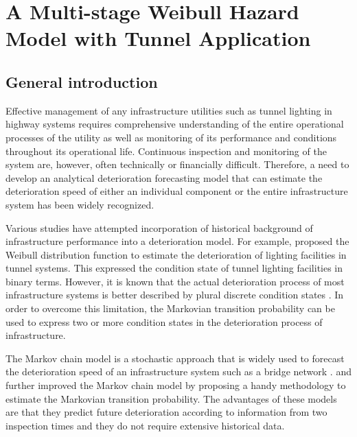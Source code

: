 
\chapter{A Multi-stage Weibull Hazard Model with Tunnel Application} %
\label{Chapter3}

\section{General introduction}
\label{31}
Effective management of any infrastructure utilities such as tunnel lighting in highway systems requires comprehensive understanding of the entire operational processes of the utility as well as monitoring of its performance and conditions throughout its operational life. Continuous inspection and monitoring of the system are, however, often technically or financially difficult. Therefore, a need to develop an analytical deterioration forecasting model that can estimate the deterioration speed of either an individual component or the entire infrastructure system has been widely recognized. 

Various studies have attempted incorporation of historical background of infrastructure performance into a deterioration model. For example, \citet{aokia} proposed the Weibull distribution function to estimate the deterioration of lighting facilities in tunnel systems. This expressed the condition state of tunnel lighting facilities in binary terms. However, it is known that the actual deterioration process of most infrastructure systems is better described by plural discrete condition states \cite{shahin05}. In order to overcome this limitation, the Markovian transition probability can be used to express two or more condition states in the deterioration process of infrastructure.

The Markov chain model is a stochastic approach that is widely used to forecast the deterioration speed of an infrastructure system such as a bridge network \cite{madanat95,Guido04,Robelin07,Morcous05}. \citet{toukei} and \citet{kobayashitsuda} further improved the Markov chain model by proposing a handy methodology to estimate the Markovian transition probability. The advantages of these models are that they predict future deterioration according to information from two inspection times and they do not  require extensive historical data.

